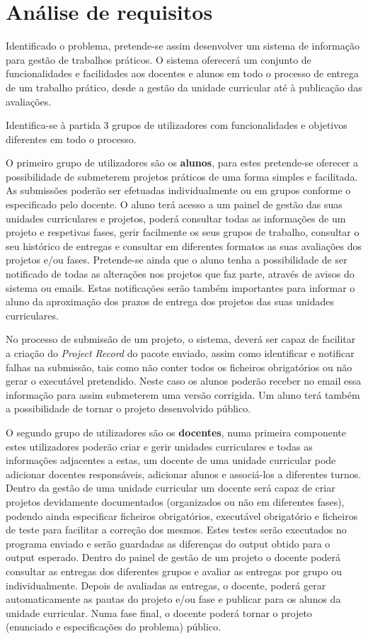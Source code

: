 \section{Análise de requisitos}


Identificado o problema, pretende-se assim desenvolver um sistema de informação para gestão de trabalhos práticos. O sistema oferecerá um conjunto de funcionalidades e facilidades aos docentes e alunos em todo o processo de entrega de um trabalho prático, desde a gestão da unidade curricular até à publicação das avaliações.

Identifica-se à partida 3 grupos de utilizadores com funcionalidades e objetivos diferentes em todo o processo.

O primeiro grupo de utilizadores são os \textbf{alunos}, para estes pretende-se oferecer a possibilidade de submeterem projetos práticos de uma forma simples e facilitada. As submissões poderão ser efetuadas individualmente ou em grupos conforme o especificado pelo docente. O aluno terá acesso a um painel de gestão das suas unidades curriculares e projetos, poderá consultar todas as informações de um projeto e respetivas fases, gerir facilmente os seus grupos de trabalho, consultar o seu histórico de entregas e consultar em diferentes formatos as suas avaliações dos projetos e/ou fases. Pretende-se ainda que o aluno tenha a possibilidade de ser notificado de todas as alterações nos projetos que faz parte, através de avisos do sistema ou emails. Estas notificações serão também importantes para informar o aluno da aproximação dos prazos de entrega dos projetos das suas unidades curriculares.

No processo de submissão de um projeto, o sistema, deverá ser capaz de facilitar a criação do \textit{Project Record} do pacote enviado, assim como identificar e notificar falhas na submissão, tais como não conter todos os ficheiros obrigatórios ou não gerar o executável pretendido. Neste caso os alunos poderão receber no email essa informação para assim submeterem uma versão corrigida.
Um aluno terá também a possibilidade de tornar o projeto desenvolvido público.

O segundo grupo de utilizadores são os \textbf{docentes}, numa primeira componente estes utilizadores poderão criar e gerir unidades curriculares e todas as informações adjacentes a estas, um docente de uma unidade curricular pode adicionar docentes responsáveis, adicionar alunos e associá­-los a diferentes turnos. Dentro da gestão de uma unidade curricular um docente será capaz de criar projetos devidamente documentados (organizados ou não em diferentes fases), podendo ainda especificar ficheiros obrigatórios, executável obrigatório e ficheiros de teste para facilitar a correção dos mesmos. Estes testes serão executados no programa enviado e serão guardadas as diferenças do output obtido para o output esperado. Dentro do painel de gestão de um projeto o docente poderá consultar as entregas dos diferentes grupos e avaliar as entregas por grupo ou individualmente. Depois de avaliadas as entregas, o docente, poderá gerar automaticamente as pautas do projeto e/ou fase e publicar para os alunos da unidade curricular.
Numa fase final, o docente poderá tornar o projeto (enunciado e especificações do problema) público.

